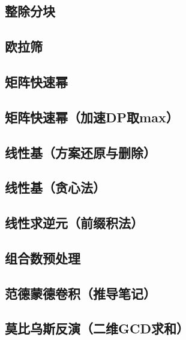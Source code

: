 \documentclass[11pt,a4paper]{ctexart}
\begin{document}
\subsection{整除分块}


\subsection{欧拉筛}


\subsection{矩阵快速幂}


\subsection{矩阵快速幂（加速DP取max）}


\subsection{线性基（方案还原与删除）}


\subsection{线性基（贪心法）}


\subsection{线性求逆元（前缀积法）}


\subsection{组合数预处理}


\subsection{范德蒙德卷积（推导笔记）}


\subsection{莫比乌斯反演（二维GCD求和）}

\end{document}
